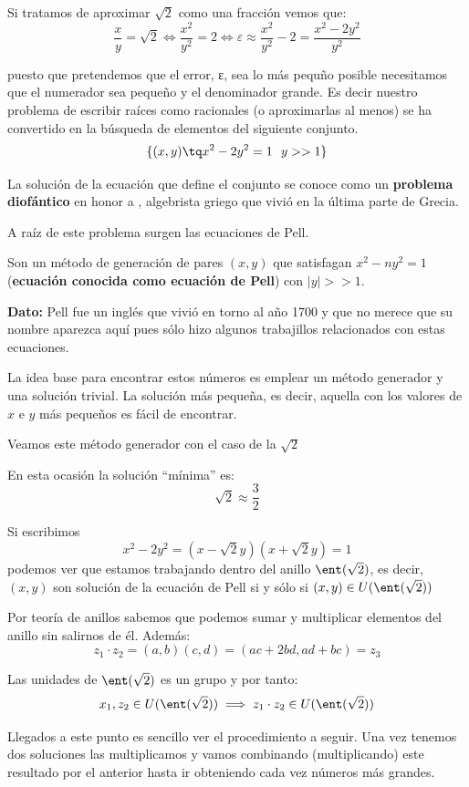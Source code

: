 \documentclass{apuntes}
\begin{document}
Si tratamos de aproximar $\sqrt{2}$ como una fracción vemos que:
\[\frac{x}{y} = \sqrt{2} \iff \frac{x^2}{y^2} = 2 \iff ε \approx \frac{x^2}{y^2} - 2 = \frac{x^2-2y^2}{y^2}\]

puesto que pretendemos que el error, ε, sea lo más pequño posible necesitamos que el numerador sea pequeño y el denominador grande. Es decir nuestro problema de escribir raíces como racionales (o aproximarlas al menos) se ha convertido en la búsqueda de elementos del siguiente conjunto.
\[\{(x,y) \tq x^2-2y^2 = 1 \ \ y >> 1\}\]

La solución de la ecuación que define el conjunto se conoce como un \textbf{problema diofántico} en honor a , algebrista griego que vivió en la última parte de Grecia.

A raíz de este problema surgen las ecuaciones de Pell.

\begin{defn}
Son un método de generación de pares $(x,y)$ que satisfagan $x^2-ny^2=1$ (\textbf{ecuación conocida como ecuación de Pell}) con $|y|>>1$.

\textbf{Dato:} Pell fue un inglés que vivió en torno al año 1700 y que no merece que su nombre aparezca aquí pues sólo hizo algunos trabajillos relacionados con estas ecuaciones.
\end{defn}

La idea base para encontrar estos números es emplear un método generador y una solución trivial. La solución más pequeña, es decir, aquella con los valores de $x$ e $y$ más pequeños es fácil de encontrar.

Veamos este método generador con el caso de la $\sqrt{2}$
\begin{example}
En esta ocasión la solución ``mínima'' es:
\[\sqrt{2} \approx \frac{3}{2}\]

Si escribimos
\[x^2-2y^2 = (x-\sqrt{2}y)(x+\sqrt{2}y) = 1\]
podemos ver que estamos trabajando dentro del anillo $\ent(\sqrt{2})$, es decir, $(x,y)$ son solución de la ecuación de Pell si y sólo si $(x,y)\in U(\ent(\sqrt{2}))$

\obs Por teoría de anillos sabemos que podemos sumar y multiplicar elementos del anillo sin salirnos de él. Además:
\[z_1\cdot z_2 = (a,b)(c,d) = (ac+2bd,ad+bc) = z_3\]

\begin{prop}
Las unidades de $\ent(\sqrt{2})$ es un grupo y por tanto:
\[x_1,z_2 \in U(\ent(\sqrt{2})) \implies z_1\cdot z_2 \in U(\ent(\sqrt{2}))\]
\end{prop}

Llegados a este punto es sencillo ver el procedimiento a seguir. Una vez tenemos dos soluciones las multiplicamos y vamos combinando (multiplicando) este resultado por el anterior hasta ir obteniendo cada vez números más grandes.
\end{example}
\end{document}
